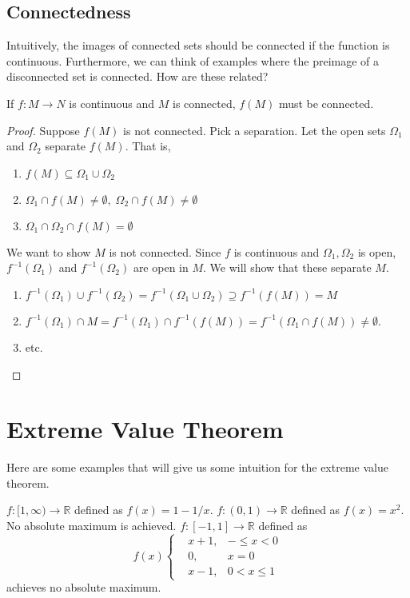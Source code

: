 \documentclass[11pt]{article}
\theoremstyle{definition}
\newcommand{\R}{\mathbb{R}}                      %
\begin{document}
\subsection{Connectedness}

Intuitively, the images of connected sets should be connected if the function is continuous. Furthermore, we can think of examples where the preimage of a disconnected set is connected. How are these related?

\prop If $f:M\to N$ is continuous and $M$ is connected, $f(M)$ must be connected.

\begin{proof}
    Suppose $f(M)$ is not connected. Pick a separation. Let the open sets $\Omega_1$ and $\Omega_2$ separate $f(M)$. That is,
    \begin{enumerate}
        \item $f(M)\subseteq \Omega_1\cup \Omega_2$
        \item $\Omega_1\cap f(M)\neq\emptyset,\;\Omega_2\cap f(M)\neq\emptyset$
        \item $\Omega_1\cap\Omega_2\cap f(M)=\emptyset$
    \end{enumerate}
    We want to show $M$ is not connected. Since $f$ is continuous and $\Omega_1,\Omega_2$ is open, $f^{-1}(\Omega_1)$ and $f^{-1}(\Omega_2)$ are open in $M$. We will show that these separate $M$.
    \begin{enumerate}
        \item $f^{-1}(\Omega_1)\cup f^{-1}(\Omega_2)=f^{-1}(\Omega_1\cup\Omega_2)\supseteq f^{-1}(f(M))=M$
        \item $f^{-1}(\Omega_1)\cap M=f^{-1}(\Omega_1)\cap f^{-1}(f(M))=f^{-1}(\Omega_1\cap f(M))\neq\emptyset.$
        \item etc.
    \end{enumerate}
\end{proof}

\section{Extreme Value Theorem}
Here are some examples that will give us some intuition for the extreme value theorem.

\ex $f:[1,\infty)\to \R$ defined as $f(x)=1-1/x$.
\ex $f:(0,1)\to \R$ defined as $f(x)=x^2$. No absolute maximum is achieved.
\ex $f:[-1,1]\to \R$ defined as 
$$
f(x)\left\{\begin{aligned}
    &x+1,&-\leq x<0\\
    &0, &x=0\\
    &x-1, &0<x\leq 1
\end{aligned} \right.
$$
achieves no absolute maximum.
\end{document}
